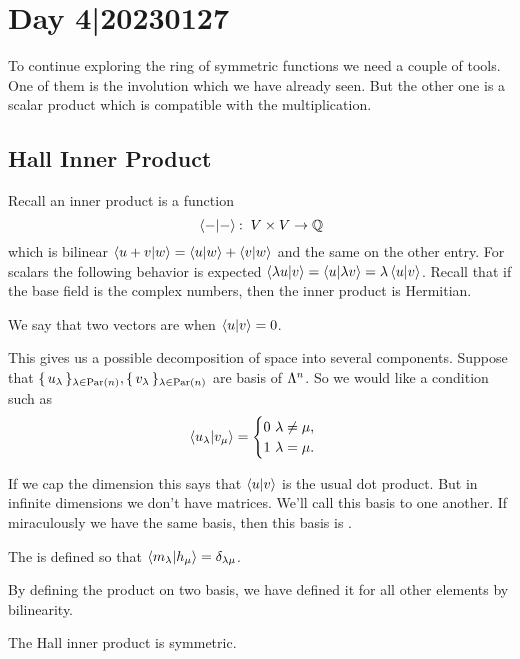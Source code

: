 \documentclass[12pt]{memoir}
\begin{document}
\section{Day 4|20230127}

To continue exploring the ring of symmetric functions we need a couple of tools. One of them is the involution which we have already seen. But the other one is a scalar product which is compatible with the multiplication.

\subsection{Hall Inner Product}

Recall an inner product is a function 
$$\braket*{-}{-}\mathbin{:}\ V\times V\to \mathbb{Q}$$
which is bilinear $\braket{u+v}{w}=\braket{u}{w}+\braket{v}{w}$ and the same on the other entry. For scalars the following behavior is expected $\braket{\lambda u}{v}=\braket{u}{\lambda v}=\lambda\braket{u}{v}$. Recall that if the base field is the complex numbers, then the inner product is Hermitian.

\begin{Def}
    We say that two vectors are  when $\braket{u}{v}=0$.
\end{Def}

This gives us a possible decomposition of space into several components. Suppose that $\{\,u_\lambda\,\}_{\lambda\in\text{Par}(n)},\{\,v_\lambda\,\}_{\lambda\in\text{Par}(n)}$ are basis of $\Lambda^n$. So we would like a condition such as 
$$\braket{u_\lambda}{v_\mu}=\begin{cases}
    0\ \lambda\neq\mu,\\
    1\ \lambda=\mu.
\end{cases}$$

If we cap the dimension this says that $\braket{u}{v}$ is the usual dot product. But in infinite dimensions we don't have matrices. We'll call this basis  to one another. If miraculously we have the same basis, then this basis is .

\begin{Def}
    The  is defined so that $\braket{m_\lambda}{h_\mu}=\delta_{\lambda\mu}$.
\end{Def}

By defining the product on two basis, we have defined it for all other elements by bilinearity. 

\begin{Lem}
    The Hall inner product is symmetric.
\end{Lem}
\end{document}
